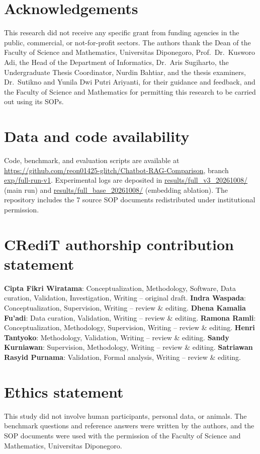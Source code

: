 \documentclass[preprint,10pt]{elsarticle}
\begin{document}
\section*{Acknowledgements}
This research did not receive any specific grant from funding agencies in the public, commercial, or not-for-profit sectors. The authors thank the Dean of the Faculty of Science and Mathematics, Universitas Diponegoro, Prof.\ Dr.\ Kusworo Adi, the Head of the Department of Informatics, Dr.\ Aris Sugiharto, the Undergraduate Thesis Coordinator, Nurdin Bahtiar, and the thesis examiners, Dr.\ Sutikno and Yunila Dwi Putri Ariyanti, for their guidance and feedback, and the Faculty of Science and Mathematics for permitting this research to be carried out using its SOPs.

\section*{Data and code availability}
Code, benchmark, and evaluation scripts are available at \url{https://github.com/reon01425-glitch/Chatbot-RAG-Comparison}, branch \url{exp/full-run-v1}. Experimental logs are deposited in \url{results/full_v3_20261008/} (main run) and \url{results/full_base_20261008/} (embedding ablation). The repository includes the 7 source SOP documents redistributed under institutional permission.

\section*{CRediT authorship contribution statement}
\textbf{Cipta Fikri Wiratama}: Conceptualization, Methodology, Software, Data curation, Validation, Investigation, Writing -- original draft. \textbf{Indra Waspada}: Conceptualization, Supervision, Writing -- review \& editing. \textbf{Dhena Kamalia Fu'adi}: Data curation, Validation, Writing -- review \& editing. \textbf{Ramona Ramli}: Conceptualization, Methodology, Supervision, Writing -- review \& editing. \textbf{Henri Tantyoko}: Methodology, Validation, Writing -- review \& editing. \textbf{Sandy Kurniawan}: Supervision, Methodology, Writing -- review \& editing. \textbf{Satriawan Rasyid Purnama}: Validation, Formal analysis, Writing -- review \& editing.

\section*{Ethics statement}
This study did not involve human participants, personal data, or animals. The benchmark questions and reference answers were written by the authors, and the SOP documents were used with the permission of the Faculty of Science and Mathematics, Universitas Diponegoro.
\end{document}
